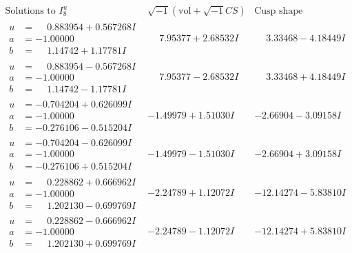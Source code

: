 \documentclass[1p]{elsarticle_modified}
\theoremstyle{definition}
\newcommand{\I}{\sqrt{-1}}
\begin{document}
$$\begin{array}{c|c|c}  
\text{Solutions to }I^u_{8}& \I (\text{vol} + \sqrt{-1}CS) & \text{Cusp shape}\\
 \hline 
\begin{aligned}
u &= \phantom{-}0.883954 + 0.567268 I \\
a &= -1.00000\phantom{ +0.000000I} \\
b &= \phantom{-}1.14742 + 1.17781 I\end{aligned}
 & \phantom{-}7.95377 + 2.68532 I & \phantom{-}3.33468 - 4.18449 I \\ \hline\begin{aligned}
u &= \phantom{-}0.883954 - 0.567268 I \\
a &= -1.00000\phantom{ +0.000000I} \\
b &= \phantom{-}1.14742 - 1.17781 I\end{aligned}
 & \phantom{-}7.95377 - 2.68532 I & \phantom{-}3.33468 + 4.18449 I \\ \hline\begin{aligned}
u &= -0.704204 + 0.626099 I \\
a &= -1.00000\phantom{ +0.000000I} \\
b &= -0.276106 - 0.515204 I\end{aligned}
 & -1.49979 + 1.51030 I & -2.66904 - 3.09158 I \\ \hline\begin{aligned}
u &= -0.704204 - 0.626099 I \\
a &= -1.00000\phantom{ +0.000000I} \\
b &= -0.276106 + 0.515204 I\end{aligned}
 & -1.49979 - 1.51030 I & -2.66904 + 3.09158 I \\ \hline\begin{aligned}
u &= \phantom{-}0.228862 + 0.666962 I \\
a &= -1.00000\phantom{ +0.000000I} \\
b &= \phantom{-}1.202130 - 0.699769 I\end{aligned}
 & -2.24789 + 1.12072 I & -12.14274 - 5.83810 I \\ \hline\begin{aligned}
u &= \phantom{-}0.228862 - 0.666962 I \\
a &= -1.00000\phantom{ +0.000000I} \\
b &= \phantom{-}1.202130 + 0.699769 I\end{aligned}
 & -2.24789 - 1.12072 I & -12.14274 + 5.83810 I \\ \hline\begin{aligned}

\end{aligned}
\end{array}$$
\end{document}
